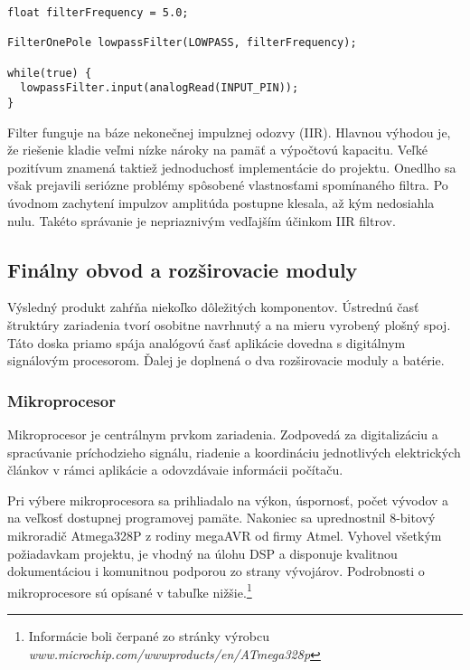 \documentclass[titlepage]{article}
\begin{document}
\begin{lstlisting}
float filterFrequency = 5.0; 

FilterOnePole lowpassFilter(LOWPASS, filterFrequency);

while(true) {
  lowpassFilter.input(analogRead(INPUT_PIN));
}
\end{lstlisting}

Filter funguje na báze nekonečnej impulznej odozvy (IIR). Hlavnou výhodou je, že riešenie kladie veľmi nízke nároky na pamäť a výpočtovú kapacitu. Veľké pozitívum znamená taktiež jednoduchosť implementácie do projektu. Onedlho sa však prejavili seriózne problémy spôsobené vlastnosťami spomínaného filtra. Po úvodnom zachytení impulzov amplitúda postupne klesala, až kým nedosiahla nulu. Takéto správanie je nepriaznivým vedľajším účinkom IIR filtrov. 

\newpage
\subsection{Finálny obvod a rozširovacie moduly}
Výsledný produkt zahŕňa niekoľko dôležitých komponentov. Ústrednú časť štruktúry zariadenia tvorí osobitne navrhnutý a na mieru vyrobený plošný spoj. Táto doska priamo spája analógovú časť aplikácie dovedna s digitálnym signálovým procesorom. Ďalej je doplnená o dva rozširovacie moduly a batérie.

\subsubsection{Mikroprocesor}
Mikroprocesor je centrálnym prvkom zariadenia. Zodpovedá za digitalizáciu a spracúvanie príchodzieho signálu, riadenie a koordináciu jednotlivých elektrických článkov v rámci aplikácie a odovzdávaie informácii počítaču.

Pri výbere mikroprocesora sa prihliadalo na výkon, úspornosť, počet vývodov a na veľkosť dostupnej programovej pamäte. Nakoniec sa uprednostnil 8-bitový mikroradič Atmega328P z rodiny megaAVR od firmy Atmel. Vyhovel všetkým požiadavkam projektu, je vhodný na úlohu DSP a disponuje kvalitnou dokumentáciou i komunitnou podporou zo strany vývojárov. 
Podrobnosti o mikroprocesore sú opísané v tabuľke nižšie.\footnote{Informácie boli čerpané zo stránky výrobcu \textit{www.microchip.com/wwwproducts/en/ATmega328p}}
\end{document}
